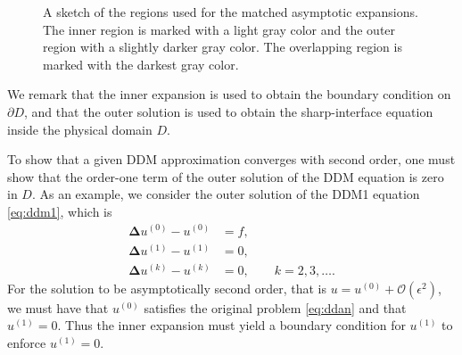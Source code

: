 \documentclass[11pt,b5paper,DIV=calc,BCOR1.3cm,headings=small,%
               footinclude=false,headsepline]{scrbook}
\newcommand*{\lapl}{\boldsymbol\Delta}
\newcommand*{\bigo}[1]{\ensuremath{\mathcal O\left(#1\right)}}
\begin{document}
\begin{figure}[b!p]
  \caption{A sketch of the regions used for the matched asymptotic expansions.
    The inner region is marked with a light gray color and the outer region
    with a slightly darker gray color.  The overlapping region is marked with
    the darkest gray color.}
  \label{fig:regions}
\end{figure}

We remark that the inner expansion is used to obtain the boundary condition on
$\partial D$, and that the outer solution is used to obtain the sharp-interface
equation inside the physical domain $D$.

To show that a given DDM approximation converges with second order, one must
show that the order-one term of the outer solution of the DDM equation is zero
in $D$.  As an example, we consider the outer solution of the DDM1 equation
\eqref{eq:ddm1}, which is
\begin{equation}
  \begin{split}
    \lapl u^{(0)} - u^{(0)} &= f, \\
    \lapl u^{(1)} - u^{(1)} &= 0, \\
    \lapl u^{(k)} - u^{(k)} &= 0,\qquad k = 2,3,\dots.
  \end{split}
  \label{eq:ddm_outer}
\end{equation}
For the solution to be asymptotically second order, that is $u = u^{(0)}
+ \bigo{\epsilon^2}$, we must have that $u^{(0)}$ satisfies the original
problem \eqref{eq:ddan} and that $u^{(1)}=0$.  Thus the inner expansion must
yield a boundary condition for $u^{(1)}$ to enforce $u^{(1)}=0$.
\end{document}
